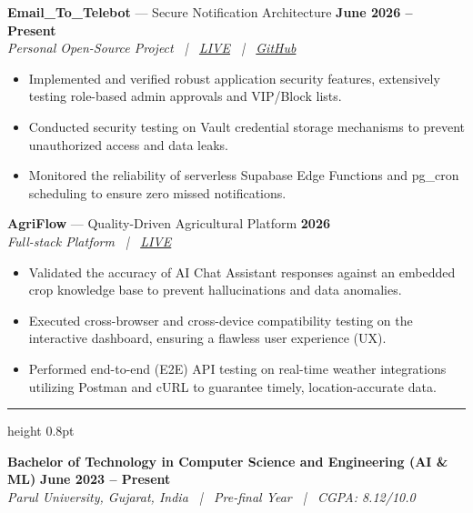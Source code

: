 \documentclass[10pt,a4paper]{article}
\newcommand{\resumesection}[1]{%
  \vspace{5pt}%
  \noindent{\large\textbf{#1}}\par
  \vspace{1pt}%
  \hrule height 0.8pt
  \vspace{3pt}%
}
\begin{document}
\noindent\textbf{Email\_To\_Telebot} --- Secure Notification Architecture \hfill \textbf{June 2026 -- Present} \\
\textit{Personal Open-Source Project \ | \ \href{https://rahul-pamula.github.io/Email_to_telebot/}{LIVE} \ | \ \href{https://github.com/Rahul-pamula/Email_to_telebot}{GitHub}}
\begin{itemize}[leftmargin=1.2em, topsep=0pt, itemsep=0pt, parsep=0pt]
    \item Implemented and verified robust application security features, extensively testing role-based admin approvals and VIP/Block lists.
    \item Conducted security testing on Vault credential storage mechanisms to prevent unauthorized access and data leaks.
    \item Monitored the reliability of serverless Supabase Edge Functions and pg\_cron scheduling to ensure zero missed notifications.
\end{itemize}

\vspace{1pt}

\noindent\textbf{AgriFlow} --- Quality-Driven Agricultural Platform \hfill \textbf{2026} \\
\textit{Full-stack Platform \ | \ \href{https://agriflow-frontend.onrender.com/}{LIVE}}
\begin{itemize}[leftmargin=1.2em, topsep=0pt, itemsep=0pt, parsep=0pt]
    \item Validated the accuracy of AI Chat Assistant responses against an embedded crop knowledge base to prevent hallucinations and data anomalies.
    \item Executed cross-browser and cross-device compatibility testing on the interactive dashboard, ensuring a flawless user experience (UX).
    \item Performed end-to-end (E2E) API testing on real-time weather integrations utilizing Postman and cURL to guarantee timely, location-accurate data.
\end{itemize}

\resumesection{EDUCATION}

\noindent\textbf{Bachelor of Technology in Computer Science and Engineering (AI \& ML)} \hfill \textbf{June 2023 -- Present} \\
\textit{Parul University, Gujarat, India \ | \ Pre-final Year \ | \ CGPA: 8.12/10.0}

\vspace{1pt}
\end{document}
